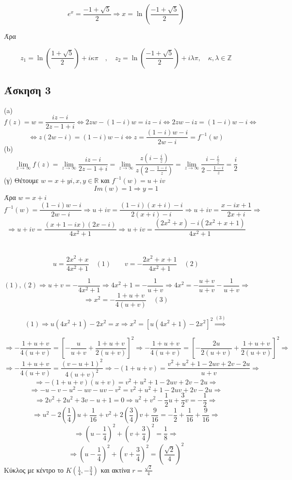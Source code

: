 \documentclass[12pt]{article}
\begin{document}
 $$ e^x=\frac{-1 + \sqrt{5}}{2} \Rightarrow x= \ln\left( \frac{-1 + \sqrt{5}}{2} \right) $$
 
Άρα

$$ z_1= \ln\left( \frac{1 + \sqrt{5}}{2} \right) +i \kappa \pi \quad , \quad  z_2=\ln\left( \frac{-1 + \sqrt{5}}{2} \right) +i \lambda \pi , \quad \kappa,\lambda \in \mathbb{Z} $$ 
 

 
 \newpage
 \subsection{Άσκηση 3}
(a)
$$ f(z)=w=\frac{iz-i}{2z-1+i} \Leftrightarrow 2zw-(1-i)w=iz-i \Leftrightarrow 2zw-iz=(1-i)w-i \Leftrightarrow $$
$$ \Leftrightarrow z(2w-i)= (1-i)w-i \Leftrightarrow 
 z=\frac{(1-i)w-i}{2w-i}=f^{-1}(w)$$
(b)
$$ \lim_{z \to \infty} f(z)= \lim_{z \to \infty}\frac{iz-i}{2z-1+i}=\lim_{z \to \infty}\frac{z\left(i-\frac{i}{z}\right)}{z\left(2-\frac{1-i}{z}\right)}=\lim_{z \to \infty}\frac{i-\frac{i}{z}}{2-\frac{1-i}{z}}=\frac{i}{2}   $$
(γ)
Θέτουμε $w=x+yi, x,y \in \mathbb{R}$ και $f^{-1}(w)=u+iv$
$$Im(w)=1 \Rightarrow y=1 $$
Άρα $w=x+i$
$$ f^{-1}(w)=\frac{(1-i)w-i}{2w-i} \Rightarrow u+iv=\frac{(1-i)(x+i)-i}{2(x+i)-i} \Rightarrow
u+iv=\frac{x-ix+1}{2x+i} \Rightarrow$$
$$ \Rightarrow u+iv=\frac{(x+1-ix)(2x-i)}{4x^2+1} \Rightarrow u+iv=\frac{(2x^2+x)-i(2x^2+x+1)}{4x^2+1} $$
\\ \\
$$ u=\frac{2x^2+x}{4x^2+1} \quad (1)  \qquad v=-\frac{2x^2+x+1}{4x^2+1} \quad (2)$$

$$ (1),(2)\Rightarrow u+v=-\frac{1}{4x^2+1} \Rightarrow 4x^2+1=-\frac{1}{u+v} \Rightarrow 4x^2=-\frac{u+v}{u+v}-\frac{1}{u+v} \Rightarrow $$
$$ \Rightarrow x^2=-\frac{1+u+v}{4(u+v)} \quad (3) $$

$$ (1)\Rightarrow u(4x^2+1)-2x^2=x \Rightarrow x^2=[u(4x^2+1)-2x^2]^2 \overset{(3)}{\Longrightarrow}$$

$$\Rightarrow -\frac{1+u+v}{4(u+v)} = \left[-\frac{u}{u+v}+\frac{1+u+v}{2(u+v)}\right]^2 
\Rightarrow -\frac{1+u+v}{4(u+v)} = \left[-\frac{2u}{2(u+v)}+\frac{1+u+v}{2(u+v)}\right]^2 \Rightarrow$$
$$ \Rightarrow -\frac{1+u+v}{4(u+v)} = \frac{(v-u+1)^2}{4(u+v)^2} \Rightarrow -(1+u+v)=\frac{v^2+u^2+1-2uv+2v-2u}{u+v} \Rightarrow $$
$$
\Rightarrow -(1+u+v)(u+v)=v^2+u^2+1-2uv+2v-2u \Rightarrow $$
$$\Rightarrow -u-v-u^2-uv-uv-v^2=v^2+u^2+1-2uv+2v-2u \Rightarrow $$
$$\Rightarrow 2v^2+2u^2+3v-u+1=0 \Rightarrow   u^2+v^2-\frac{1}{2}u+\frac{3}{2}v=-\frac{1}{2} \Rightarrow $$
$$\Rightarrow  u^2-2\left(\frac{1}{4}\right)u+\frac{1}{16}+v^2+2\left(\frac{3}{4}\right)v+\frac{9}{16}=-\frac{1}{2}+\frac{1}{16}+\frac{9}{16} \Rightarrow $$
$$\Rightarrow  \left( u-\frac{1}{4} \right)^2+\left( v+\frac{3}{4} \right)^2=\frac{1}{8} \Rightarrow $$
$$ \Rightarrow  \left( u-\frac{1}{4} \right)^2+\left( v+\frac{3}{4} \right)^2=\left(\frac{\sqrt{2}}{4}\right)^2 $$
Κύκλος με κέντρο το $Κ\left(\frac{1}{4},-\frac{3}{4}\right)$ και ακτίνα $r=\frac{\sqrt{2}}{4}$ 
\newpage
\end{document}
